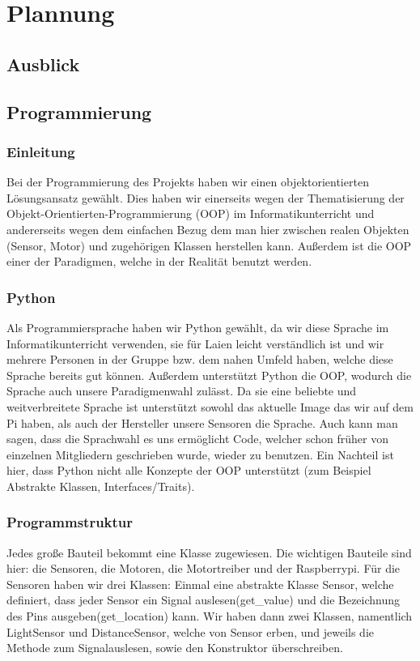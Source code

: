 \documentclass{report}
\begin{document}
\chapter{Plannung}

\section{Ausblick}

\section{Programmierung}

\subsection{Einleitung}
Bei der Programmierung des Projekts haben wir einen objektorientierten Lösungsansatz gewählt. Dies haben wir einerseits wegen der Thematisierung der Objekt-Orientierten-Programmierung (OOP) im Informatikunterricht und andererseits wegen dem einfachen Bezug dem man hier zwischen realen Objekten (Sensor, Motor) und zugehörigen Klassen herstellen kann. Außerdem ist die OOP einer der Paradigmen, welche in der Realität benutzt werden. 

\subsection{Python}
Als Programmiersprache haben wir Python gewählt, da wir diese Sprache im Informatikunterricht verwenden, sie für Laien leicht verständlich ist und wir mehrere Personen in der Gruppe bzw. dem nahen Umfeld haben, welche diese Sprache bereits gut können. Außerdem unterstützt Python die OOP, wodurch die Sprache auch unsere Paradigmenwahl zulässt. Da sie eine beliebte und weitverbreitete Sprache ist unterstützt sowohl das aktuelle Image das wir auf dem Pi haben, als auch der Hersteller unsere Sensoren die Sprache. Auch kann man sagen, dass die Sprachwahl es uns ermöglicht Code, welcher schon früher von einzelnen Mitgliedern geschrieben wurde, wieder zu benutzen.  Ein Nachteil ist hier, dass Python nicht alle Konzepte der OOP unterstützt (zum Beispiel Abstrakte Klassen, Interfaces/Traits).

\subsection{Programmstruktur}
Jedes große Bauteil bekommt eine Klasse zugewiesen. Die wichtigen Bauteile sind hier: die Sensoren, die Motoren, die Motortreiber und der Raspberrypi. Für die Sensoren haben wir drei Klassen: Einmal eine abstrakte Klasse Sensor, welche definiert, dass jeder Sensor ein Signal auslesen(get\_value) und die Bezeichnung des Pins ausgeben(get\_location) kann. Wir haben dann zwei Klassen, namentlich LightSensor und DistanceSensor, welche von Sensor erben, und jeweils die Methode zum Signalauslesen, sowie den Konstruktor überschreiben.
\end{document}
